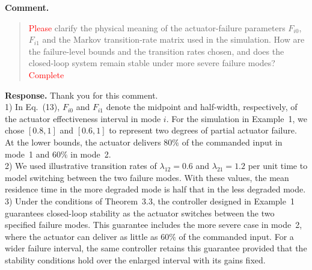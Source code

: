 \documentclass[12pt,a4paper]{article}
\begin{document}
\textbf{Comment.}
\begin{quote}
\raggedright
\textcolor{red}{Please} clarify the physical meaning of the actuator-failure parameters $F_{i0}$, $F_{i1}$ and the Markov transition-rate matrix used in the simulation. How are the failure-level bounds and the transition rates chosen, and does the closed-loop system remain stable under more severe failure modes? \textcolor{red}{Complete}
\end{quote}

\textbf{Response.}
Thank you for this comment.\\

1) In Eq.~(13), $F_{i0}$ and $F_{i1}$ denote the midpoint and half-width, respectively, of the actuator effectiveness interval in mode $i$. For the simulation in Example~1, we chose $[0.8,1]$ and $[0.6,1]$ to represent two degrees of partial actuator failure. At the lower bounds, the actuator delivers $80\%$ of the commanded input in mode~1 and $60\%$ in mode~2.\\

2) We used illustrative transition rates of $\lambda_{12}=0.6$ and $\lambda_{21}=1.2$ per unit time to model switching between the two failure modes. With these values, the mean residence time in the more degraded mode is half that in the less degraded mode.\\

3) Under the conditions of Theorem~3.3, the controller designed in Example~1 guarantees closed-loop stability as the actuator switches between the two specified failure modes. This guarantee includes the more severe case in mode~2, where the actuator can deliver as little as $60\%$ of the commanded input. For a wider failure interval, the same controller retains this guarantee provided that the stability conditions hold over the enlarged interval with its gains fixed.

\end{document}
